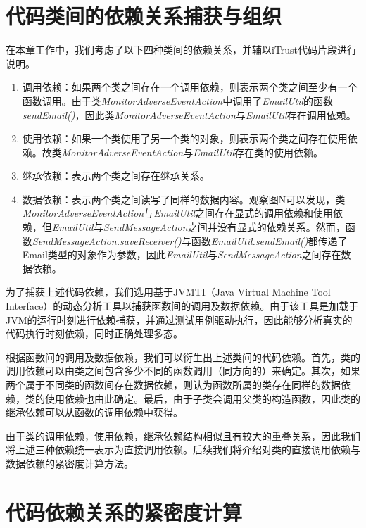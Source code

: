 \section{代码类间的依赖关系捕获与组织}
在本章工作中，我们考虑了以下四种类间的依赖关系，并辅以iTrust代码片段进行说明。

\begin{enumerate}
  \item 调用依赖：如果两个类之间存在一个调用依赖，则表示两个类之间至少有一个函数调用。由于类\emph{MonitorAdverseEventAction}中调用了\emph{EmailUtil}的函数\emph{sendEmail()}，因此类\emph{MonitorAdverseEventAction}与\emph{EmailUtil}存在调用依赖。
  \item 使用依赖：如果一个类使用了另一个类的对象，则表示两个类之间存在使用依赖。故类\emph{MonitorAdverseEventAction}与\emph{EmailUtil}存在类的使用依赖。
  \item 继承依赖：表示两个类之间存在继承关系。
  \item 数据依赖：表示两个类之间读写了同样的数据内容\cite{kuang2015can}。观察图N可以发现，类\emph{MonitorAdverseEventAction}与\emph{EmailUtil}之间存在显式的调用依赖和使用依赖，但\emph{EmailUtil}与\emph{SendMessageAction}之间并没有显式的依赖关系。然而，函数\emph{SendMessageAction.saveReceiver()}与函数\emph{EmailUtil.sendEmail()}都传递了Email类型的对象作为参数，因此\emph{EmailUtil}与\emph{SendMessageAction}之间存在数据依赖。
\end{enumerate}

为了捕获上述代码依赖，我们选用基于JVMTI（Java Virtual Machine Tool Interface）的动态分析工具\cite{kuang2015can}以捕获函数间的调用及数据依赖。由于该工具是加载于JVM的运行时刻进行依赖捕获，并通过测试用例驱动执行，因此能够分析真实的代码执行时刻依赖，同时正确处理多态。

根据函数间的调用及数据依赖，我们可以衍生出上述类间的代码依赖。首先，类的调用依赖可以由类之间包含多少不同的函数调用（同方向的）来确定。其次，如果两个属于不同类的函数间存在数据依赖，则认为函数所属的类存在同样的数据依赖，类的使用依赖也由此确定。最后，由于子类会调用父类的构造函数，因此类的继承依赖可以从函数的调用依赖中获得。

由于类的调用依赖，使用依赖，继承依赖结构相似且有较大的重叠关系，因此我们将上述三种依赖统一表示为直接调用依赖。后续我们将介绍对类的直接调用依赖与数据依赖的紧密度计算方法。

\section{代码依赖关系的紧密度计算}

